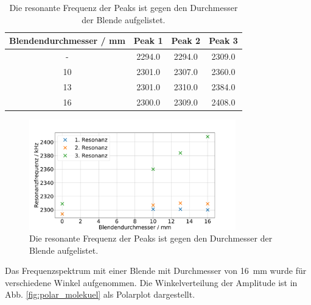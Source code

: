 \begin{table}\caption{Die resonante Frequenz der Peaks ist gegen den Durchmesser der Blende aufgelistet.}
    \label{tab:ende}
    \centering
     \begin{tabular}{c | c c c} 
    \toprule
{Blendendurchmesser / \si{\milli\meter}} & {Peak 1} & {Peak 2} & {Peak 3}   \\
\midrule
-  & 2294.0 & 2294.0 & 2309.0 \\ 
10 & 2301.0 & 2307.0 & 2360.0 \\
13 & 2301.0 & 2310.0 & 2384.0 \\
16 & 2300.0 & 2309.0 & 2408.0 \\
\bottomrule
\end{tabular}\end{table}

\begin{figure}
    \centering
    \includegraphics[width=0.8\textwidth]{plots/D_2.pdf}
    \caption{Die resonante Frequenz der Peaks ist gegen den Durchmesser der Blende aufgelistet.}
    \label{fig:resonanzen}
\end{figure}

Das Frequenzspektrum mit einer Blende mit Durchmesser von \SI{16}{\milli\metre} wurde für verschiedene Winkel aufgenommen. Die Winkelverteilung der Amplitude ist in Abb. \ref{fig:polar_molekuel} als Polarplot dargestellt. 

